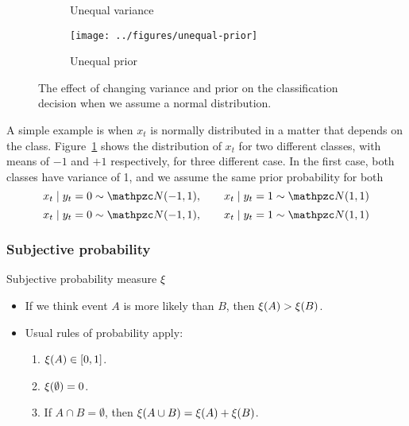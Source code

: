 \begin{frame}
\begin{figure}[H]
\begin{subfigure}{\fwidth}
      \caption{Unequal variance}
    \end{subfigure}
    \begin{subfigure}{\fwidth}
      \texttt{[image: ../figures/unequal-prior]}
      \caption{Unequal prior}
    \end{subfigure}
    \caption{The effect of changing variance and prior on the classification decision when we assume a normal distribution.}
    \label{fig:normal-generative}
  \end{figure}
  \begin{example}
    A simple example is when $x_t$ is normally distributed in a matter that depends on the class.  Figure~\ref{fig:normal-generative} shows the distribution of $x_t$ for two different classes, with means of $-1$ and $+1$ respectively, for three different case. In the first case, both classes have variance of 1, and we assume the same prior probability for both
    \[
    x_t \mid y_t = 0 \sim \Normal(-1,1),
    \qquad
    x_t \mid y_t = 1 \sim \Normal(1,1)
    \]
    \[
    x_t \mid y_t = 0 \sim \Normal(-1,1),
    \qquad
    x_t \mid y_t = 1 \sim \Normal(1,1)
    \]

  \end{example}
  
\end{frame}


\begin{frame}
  \frametitle{Subjective probability}
  \begin{block}{Subjective probability measure $\xi$}
    \begin{itemize}
    \item If we think event $A$ is more likely than $B$, then $\xi(A) > \xi(B)$.
    \item Usual rules of probability apply:
      \begin{enumerate}
      \item $\xi(A) \in [0,1]$.
      \item $\xi(\emptyset) = 0$.
      \item If $A \cap B = \emptyset$, then $\xi(A \cup B) = \xi(A) + \xi(B)$.
      \end{enumerate}
    \end{itemize}
  \end{block}
\end{frame}


